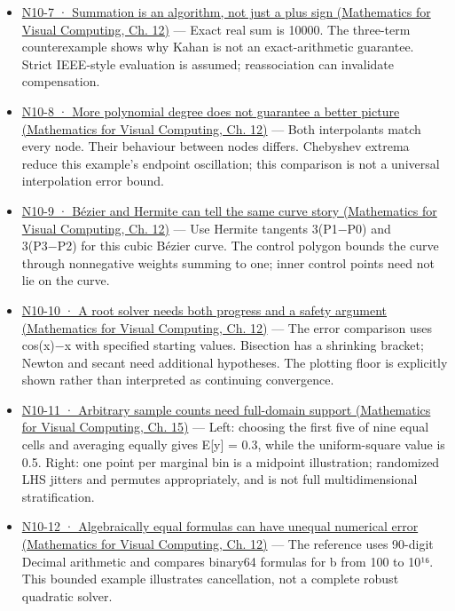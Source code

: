 \begin{itemize}
\item
  \href{../02-Mathematics-for-Visual-Computing/main.pdf\#nameddest=02-foundations-ii-ch028-figure-n10-7-summation-is-an-algorithm-not-just-a-plus-sign}{N10-7 · Summation is an algorithm, not just a plus sign (Mathematics for Visual Computing, Ch. 12)} --- Exact real sum is 10000. The three-term counterexample shows why Kahan is not an exact-arithmetic guarantee. Strict IEEE-style evaluation is assumed; reassociation can invalidate compensation.
\item
  \href{../02-Mathematics-for-Visual-Computing/main.pdf\#nameddest=02-foundations-ii-ch028-figure-n10-8-more-polynomial-degree-does-not-guarantee-a-better-picture}{N10-8 · More polynomial degree does not guarantee a better picture (Mathematics for Visual Computing, Ch. 12)} --- Both interpolants match every node. Their behaviour between nodes differs. Chebyshev extrema reduce this example's endpoint oscillation; this comparison is not a universal interpolation error bound.
\item
  \href{../02-Mathematics-for-Visual-Computing/main.pdf\#nameddest=02-foundations-ii-ch028-figure-n10-9-bézier-and-hermite-can-tell-the-same-curve-story}{N10-9 · Bézier and Hermite can tell the same curve story (Mathematics for Visual Computing, Ch. 12)} --- Use Hermite tangents 3(P1−P0) and 3(P3−P2) for this cubic Bézier curve. The control polygon bounds the curve through nonnegative weights summing to one; inner control points need not lie on the curve.
\item
  \href{../02-Mathematics-for-Visual-Computing/main.pdf\#nameddest=02-foundations-ii-ch028-figure-n10-10-a-root-solver-needs-both-progress-and-a-safety-argument}{N10-10 · A root solver needs both progress and a safety argument (Mathematics for Visual Computing, Ch. 12)} --- The error comparison uses cos(x)−x with specified starting values. Bisection has a shrinking bracket; Newton and secant need additional hypotheses. The plotting floor is explicitly shown rather than interpreted as continuing convergence.
\item
  \href{../02-Mathematics-for-Visual-Computing/main.pdf\#nameddest=02-foundations-ii-ch031-figure-n10-11-arbitrary-sample-counts-need-full-domain-support}{N10-11 · Arbitrary sample counts need full-domain support (Mathematics for Visual Computing, Ch. 15)} --- Left: choosing the first five of nine equal cells and averaging equally gives E{[}y{]} = 0.3, while the uniform-square value is 0.5. Right: one point per marginal bin is a midpoint illustration; randomized LHS jitters and permutes appropriately, and is not full multidimensional stratification.
\item
  \href{../02-Mathematics-for-Visual-Computing/main.pdf\#nameddest=02-foundations-ii-ch028-figure-n10-12-algebraically-equal-formulas-can-have-unequal-numerical-error}{N10-12 · Algebraically equal formulas can have unequal numerical error (Mathematics for Visual Computing, Ch. 12)} --- The reference uses 90-digit Decimal arithmetic and compares binary64 formulas for b from 100 to 10¹⁶. This bounded example illustrates cancellation, not a complete robust quadratic solver.
\end{itemize}

